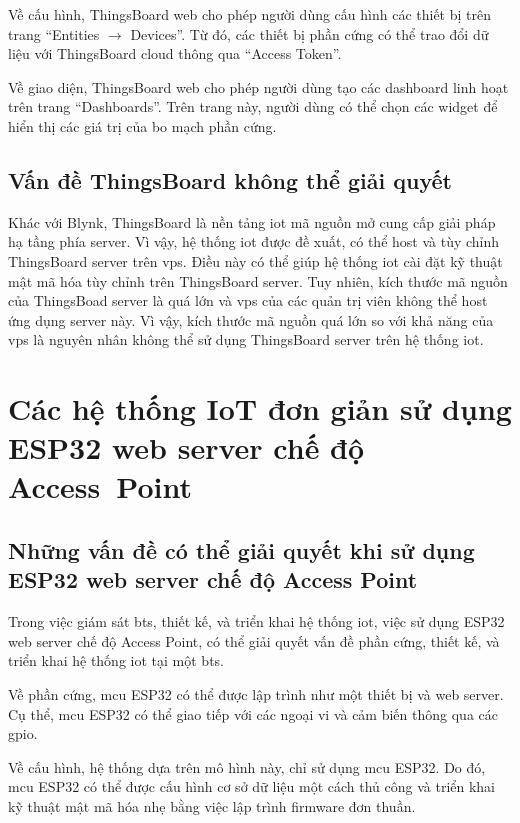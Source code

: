 Về cấu hình, ThingsBoard web cho phép người dùng cấu hình các thiết bị trên trang ``Entities $\rightarrow$ Devices''. Từ đó, các thiết bị phần cứng có thể trao đổi dữ liệu với ThingsBoard cloud thông qua ``Access Token''.

Về giao diện, ThingsBoard web cho phép người dùng tạo các dashboard linh hoạt trên trang ``Dashboards''. Trên trang này, người dùng có thể chọn các widget để hiển thị các giá trị của bo mạch phần cứng.

\subsection{Vấn đề ThingsBoard không thể giải quyết}

Khác với Blynk, ThingsBoard là nền tảng \acrshort{iot} mã nguồn mở cung cấp giải pháp hạ tầng phía server. Vì vậy, hệ thống \acrshort{iot} được đề xuất, có thể host và tùy chỉnh ThingsBoard server trên \acrshort{vps}. Điều này có thể giúp hệ thống \acrshort{iot} cài đặt kỹ thuật mật mã hóa tùy chỉnh trên ThingsBoard server. Tuy nhiên, kích thước mã nguồn của ThingsBoad server là quá lớn và \acrshort{vps} của các quản trị viên không thể host ứng dụng server này. Vì vậy, kích thước mã nguồn quá lớn so với khả năng của \acrshort{vps} là nguyên nhân không thể sử dụng ThingsBoard server trên hệ thống \acrshort{iot}.

\section{Các hệ thống IoT đơn giản sử dụng ESP32 web server chế độ Access~Point}

\subsection{Những vấn đề có thể giải quyết khi sử dụng ESP32 web server chế độ Access Point}

Trong việc giám sát \acrshort{bts}, thiết kế, và triển khai hệ thống \acrshort{iot}, việc sử dụng ESP32 web server chế độ Access Point, có thể giải quyết vấn đề phần cứng, thiết kế, và triển khai hệ thống \acrshort{iot} tại một \acrshort{bts}.

Về phần cứng, \acrshort{mcu} ESP32 có thể được lập trình như một thiết bị và web server. Cụ thể, \acrshort{mcu} ESP32 có thể giao tiếp với các ngoại vi và cảm biến thông qua các \acrfull{gpio}.

Về cấu hình, hệ thống dựa trên mô hình này, chỉ sử dụng \acrshort{mcu} ESP32. Do đó, \acrshort{mcu} ESP32 có thể được cấu hình cơ sở dữ liệu một cách thủ công và triển khai kỹ thuật mật mã hóa nhẹ bằng việc lập trình firmware đơn thuần.

